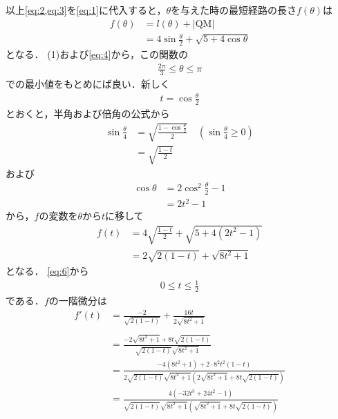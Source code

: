 \documentclass[a4paper,10pt]{ltjsarticle}
\begin{document}
\begin{multicols}{2}
  以上\cref{eq:2,eq:3}を\cref{eq:1}に代入すると，$\theta$を与えた時の最短経路の長さ$f(\theta)$は
  \begin{align}
    f(\theta)
     & = l(\theta) + |\text{QM}|                                   \\
     & = 4\sin\frac{\theta}{2} + \sqrt{5+4\cos\theta} \label{eq:5}
  \end{align}
  となる．
  (1)および\cref{eq:4}から，この関数の
  \begin{align}
    \frac{2\pi}{3} \le \theta \le \pi \label{eq:6}
  \end{align}
  での最小値をもとめにば良い．新しく
  \begin{align*}
    t=\cos\frac{\theta}{2}
  \end{align*}
  とおくと，半角および倍角の公式から
  \begin{align*}
    \sin\frac{\theta}{4}
     & = \sqrt{\frac{1-\cos\frac{\theta}{2}}{2}} \quad (\sin\frac{\theta}{4}\ge 0) \\
     & = \sqrt{\frac{1-t}{2}}
  \end{align*}
  および
  \begin{align*}
    \cos\theta
     & = 2\cos^2\frac{\theta}{2} - 1 \\
     & = 2t^2-1
  \end{align*}
  から，$f$の変数を$\theta$から$t$に移して
  \begin{align}
    f(t)
     & = 4\sqrt{\frac{1-t}{2}} + \sqrt{5+4(2t^2-1)} \nonumber \\
     & = 2\sqrt{2(1-t)} + \sqrt{8t^2+1} \label{eq:9}
  \end{align}
  となる．
  \cref{eq:6}から
  \begin{align}
    0\le t \le \frac{1}{2} \label{eq:7}
  \end{align}
  である．$f$の一階微分は
  \begin{align*}
    f'(t)
     & = \frac{-2}{\sqrt{2(1-t)}} + \frac{16t}{2\sqrt{8t^2+1}}                                                            \\                                      \\
     & = \frac{-2\sqrt{8t^2+1} + 8t\sqrt{2(1-t)}}{\sqrt{2(1-t)}\sqrt{8t^2+1}}                                             \\
     & = \frac{-4(8t^2+1) + 2\cdot 8^2t^2(1-t)}{2\sqrt{2(1-t)}\sqrt{8t^2+1}\left(2\sqrt{8t^2+1} + 8t\sqrt{2(1-t)}\right)} \\
     & = \frac{4(-32t^3 + 24t^2-1)}{\sqrt{2(1-t)}\sqrt{8t^2+1}\left(\sqrt{8t^2+1} + 8t\sqrt{2(1-t)}\right)}

\end{align*}
\end{multicols}
\end{document}
